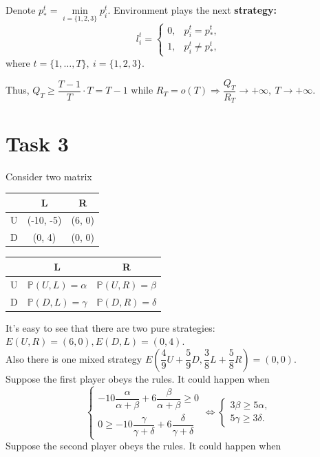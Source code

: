 \documentclass[a4paper, 12pt]{article}
\renewcommand*{\P}{\mathbb{P}}
\begin{document}
Denote $p_*^t = \min \limits_{i = \{1, 2, 3 \}} p_i^t.$ Environment plays the next \textbf{strategy:} 
$$
l_{i}^t = 
\begin{cases}
0, & p_i^t = p_*^t, \\
1, & p_i^t \neq p_*^t,
\end{cases}
$$
where $t = \{1, \ldots, T \}, ~ i = \{1, 2, 3 \}.$

Thus, $Q_T \geqslant \dfrac{T - 1}{T} \cdot T = T-1$ while $R_T = o(T) \Rightarrow \dfrac{Q_T}{R_T} \rightarrow +\infty, ~ T \rightarrow + \infty.$

\section{Task 3}
Consider two matrix
\begin{center}
\begin{tabular}{|c|c|c|} 
\hline
& L & R\\ [0.5ex] 
\hline
U & (-10, -5) & (6, 0)\\ 
\hline
D & (0, 4) & (0, 0)\\ 
\hline
\end{tabular}
\begin{tabular}{|c|c|c|} 
\hline
& L & R\\[0.5ex]
\hline
U & $\P (U, L) = \alpha$ & $\P (U, R) = \beta$\\ 
\hline
D & $\P (D, L) = \gamma$ & $\P (D, R) = \delta$\\ 
\hline
\end{tabular}
\end{center}
It's easy to see that there are two pure strategies: $E(U, R) = (6, 0), E(D, L) = (0, 4).$\\
\noindent Also there is one mixed strategy $E \left( \dfrac{4}{9} U + \dfrac{5}{9} D, \dfrac{3}{8} L + \dfrac{5}{8} R \right) = (0, 0).$\\
\noindent Suppose the first player obeys the rules. It could happen when
$$
\begin{cases}
-10 \dfrac{\alpha}{\alpha + \beta} + 6 \dfrac{\beta}{\alpha + \beta} \geqslant 0 \\
0 \geqslant -10 \dfrac{\gamma}{\gamma + \delta} + 6 \dfrac{\delta}{\gamma + \delta}
\end{cases}
\Leftrightarrow
\begin{cases}
3 \beta \geqslant 5 \alpha, \\
5 \gamma \geqslant 3 \delta.
\end{cases}
$$
Suppose the second player obeys the rules. It could happen when
\end{document}
